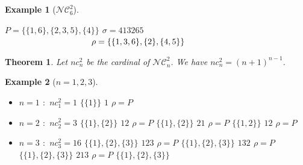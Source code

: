 \documentclass[12pt]{report}
\newtheorem{theorem}{Theorem}
\newtheorem*{example}{Example}
\begin{document}
\begin{example}[$\mathcal{NC}^2_6$]
    \begin{itemize*}
            \subitem $P = \{\{1, 6\}, \{2, 3, 5\}, \{4\}\}$
            \subitem $\sigma = 413265$ \\
            \subitem $\hspace{36mm} \rho = \{\{1, 3, 6\}, \{2\}, \{4, 5\}\}$
    \end{itemize*}    
\end{example}

\begin{theorem}
    Let $nc^2_n$ be the cardinal of $\mathcal{NC}^2_n$.
    We have $nc^2_n = (n + 1)^{n-1}$.
\end{theorem}

\begin{example}[$n = 1, 2, 3$]
    \text{}
    \begin{itemize}
            \item $n = 1$ \text{ } $:$ \text{ } $nc^2_1 = 1$
            \subitem $\{\{1\}\}$ \hspace{1cm} $1$
                \hspace{1cm} $\rho = P$
            \item $n = 2$ \text{ } $:$ \text{ } $nc^2_2 = 3$
            \subitem $\{\{1\}, \{2\}\}$ \hspace{1cm} $12$
                \hspace{1cm} $\rho = P$
            \subitem $\{\{1\}, \{2\}\}$ \hspace{1cm} $21$
                \hspace{1cm} $\rho = P$
            \subitem $\{\{1, 2\}\}$ \hspace{14mm} $12$
                \hspace{1cm} $\rho = P$
            \item $n = 3$ \text{ } $:$ \text{ } $nc^2_3 = 16$
            \subitem $\{\{1\}, \{2\}, \{3\}\}$ \hspace{1cm}
                $123$ \hspace{1cm} $\rho = P$
            \subitem $\{\{1\}, \{2\}, \{3\}\}$ \hspace{1cm}
                $132$ \hspace{1cm} $\rho = P$
            \subitem $\{\{1\}, \{2\}, \{3\}\}$ \hspace{1cm}
                $213$ \hspace{1cm} $\rho = P$
            \subitem $\{\{1\}, \{2\}, \{3\}\}$ \hspace{1cm}

\end{itemize}
\end{example}
\end{document}
